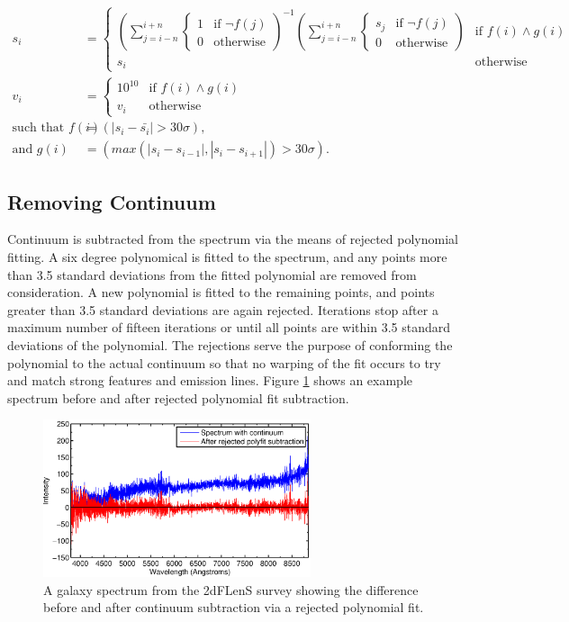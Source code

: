 \documentclass[titlesmallcaps, examinerscopy, copyrightpage]{uqthesis}
\newcommand{\brac}[1]{\left( #1 \right)}
\newcommand*\mean[1]{\bar{#1}}
\newcommand\abs[1]{\left|#1\right|}
\begin{document}
\begin{align}
s_i &= 
\begin{cases}
	\brac{\sum\limits_{j=i-n}^{i+n} \begin{cases}1 & \text{if } \lnot f(j) \\ 0 & \text{otherwise} \end{cases}}^{-1}\brac{\sum\limits_{j=i-n}^{i+n} \begin{cases}s_j & \text{if } \lnot f(j) \\ 0 & \text{otherwise} \end{cases}} & \text{if } f(i)\land g(i) \\
	s_i & \text{otherwise}
\end{cases}\\
v_i &= 
\begin{cases}
	10^{10} & \text{if } f(i)\land g(i) \\
	v_i & \text{otherwise}
\end{cases}\\
\text{such that } f(i) &= \brac{\abs{s_i - \mean{s_i}} > 30 \sigma}, \\
\text{and } g(i) &= \brac{max\brac{\abs{s_i - s_{i-1}}, \abs{s_i - s_{i+1}}} > 30 \sigma}.
\end{align} 


\subsection{Removing Continuum} \label{sec:continuum}

Continuum is subtracted from the spectrum via the means of rejected polynomial fitting. A six degree polynomical is fitted to the spectrum, and any points more than 3.5 standard deviations from the fitted polynomial are removed from consideration. A new polynomial is fitted to the remaining points, and points greater than 3.5 standard deviations are again rejected. Iterations stop after a maximum number of fifteen iterations or until all points are within 3.5 standard deviations of the polynomial. The rejections serve the purpose of conforming the polynomial to the actual continuum so that no warping of the fit occurs to try and match strong features and emission lines. Figure \ref{fig:polyfit} shows an example spectrum before and after rejected polynomial fit subtraction.


\begin{figure}[ht!]
\includegraphics[width=0.7\textwidth]{images/polyfit.eps} 
\centering
\caption{A galaxy spectrum from the 2dFLenS survey showing the difference before and after continuum subtraction via a rejected polynomial fit.}
\label{fig:polyfit}
\end{figure}
\end{document}
